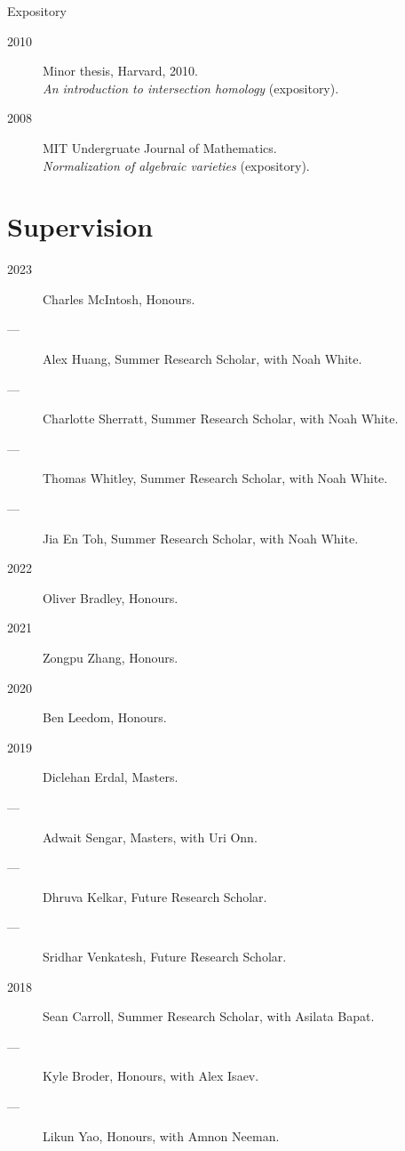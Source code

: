 \documentclass[11pt]{article}
\begin{document}
\begin{description}
\item[{Expository}] 
\end{description}
\begin{description}
\item[{2010}] Minor thesis, Harvard, 2010.\\[0pt]
\emph{An introduction to intersection homology} (expository).
\item[{2008}] MIT Undergruate Journal of Mathematics.\\[0pt]
\emph{Normalization of algebraic varieties} (expository).
\end{description}

\section*{Supervision}
\label{sec:org745469c}
\begin{description}
\item[{2023}] Charles McIntosh, Honours.
\item[{---}] Alex Huang, Summer Research Scholar, with Noah White.
\item[{---}] Charlotte Sherratt, Summer Research Scholar, with Noah White.
\item[{---}] Thomas Whitley, Summer Research Scholar, with Noah White.
\item[{---}] Jia En Toh, Summer Research Scholar, with Noah White.
\item[{2022}] Oliver Bradley, Honours.
\item[{2021}] Zongpu Zhang, Honours.
\item[{2020}] Ben Leedom, Honours.
\item[{2019}] Diclehan Erdal, Masters.
\item[{---}] Adwait Sengar, Masters, with Uri Onn.
\item[{---}] Dhruva Kelkar, Future Research Scholar.
\item[{---}] Sridhar Venkatesh, Future Research Scholar.
\item[{2018}] Sean Carroll, Summer Research Scholar, with Asilata Bapat.
\item[{---}] Kyle Broder, Honours, with Alex Isaev.
\item[{---}] Likun Yao, Honours, with Amnon Neeman.
\end{description}
\end{document}
